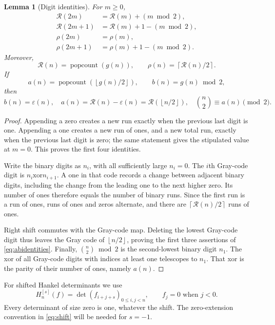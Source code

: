 \documentclass[11pt,a4paper]{article}
\numberwithin{equation}{section}
\newtheorem{lemma}[theorem]{Lemma}
\theoremstyle{definition}
\theoremstyle{remark}
\newcommand{\Runs}{\mathcal R}
\newcommand{\Ones}{\rho}
\newcommand{\eps}{\varepsilon}
\newcommand{\pop}{\operatorname{popcount}}
\newcommand{\ceil}[1]{\left\lceil #1\right\rceil}
\newcommand{\floor}[1]{\left\lfloor #1\right\rfloor}
\begin{document}
\begin{lemma}[Digit identities]\label{lem:digits}
For $m\ge0$,
\begin{align}
 \Runs(2m)&=\Runs(m)+(m\bmod2),\label{eq:runs-even}\\
 \Runs(2m+1)&=\Runs(m)+1-(m\bmod2),\label{eq:runs-odd}\\
 \Ones(2m)&=\Ones(m),\label{eq:ones-even}\\
 \Ones(2m+1)&=\Ones(m)+1-(m\bmod2).\label{eq:ones-odd}
\end{align}
Moreover,
\begin{equation}\label{eq:grayruns}
 \Runs(n)=\pop(g(n)),\qquad
 \Ones(n)=\ceil{\Runs(n)/2}.
\end{equation}
If
\begin{equation}\label{eq:ab}
 a(n)=\pop\!\left(\floor{g(n)/2}\right),\qquad b(n)=g(n)\bmod2,
\end{equation}
then
\begin{equation}\label{eq:abidentities}
 b(n)=\eps(n),\quad a(n)=\Runs(n)-\eps(n)=\Runs(\floor{n/2}),
 \quad \binom n2\equiv a(n)\pmod2.
\end{equation}
\end{lemma}
\begin{proof}
Appending a zero creates a new run exactly when the previous last digit
is one. Appending a one creates a new run of ones, and a new total run,
exactly when the previous last digit is zero; the same statement gives
the stipulated value at $m=0$. This proves the first four identities.

Write the binary digits as $n_i$, with all sufficiently large $n_i=0$.
The $i$th Gray-code digit is $n_i\mathbin{\mathrm{xor}}n_{i+1}$.
A one in that code records a change between adjacent binary digits,
including the change from the leading one to the next higher zero.
Its number of ones therefore equals the number of binary runs. Since
the first run is a run of ones, runs of ones and zeros alternate, and
there are $\ceil{\Runs(n)/2}$ runs of ones.

Right shift commutes with the Gray-code map. Deleting the lowest
Gray-code digit thus leaves the Gray code of $\floor{n/2}$, proving the
first three assertions of \eqref{eq:abidentities}. Finally,
$\binom n2\bmod2$ is the second-lowest binary digit $n_1$. The xor of all
Gray-code digits with indices at least one telescopes to $n_1$.
That xor is the parity of their number of ones, namely $a(n)$.
\end{proof}

For shifted Hankel determinants we use
\begin{equation}\label{eq:shift}
 H_n^{[s]}(f)=\det(f_{i+j+s})_{0\le i,j<n},
 \qquad f_j=0\text{ when }j<0.
\end{equation}
Every determinant of size zero is one, whatever the shift. The
zero-extension convention in \eqref{eq:shift} will be needed for $s=-1$.
\end{document}
